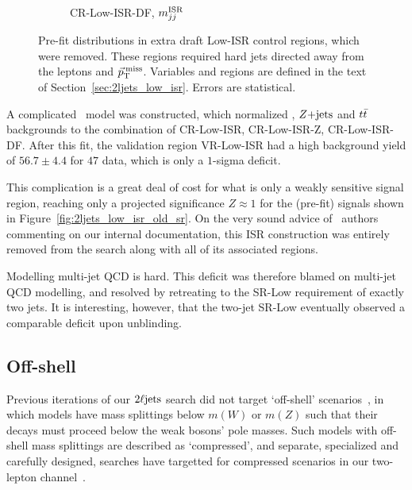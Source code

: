 \begin{figure}[tp]
\begin{subfigure}{0.62\textwidth}
\caption{CR-Low-ISR-DF, $m_{jj}^\mathrm{ISR}$}
\end{subfigure}
\caption[
Pre-fit distributions in extra draft Low-ISR control regions, which were
removed
]{%
Pre-fit distributions in extra draft Low-ISR control regions, which were
removed.
These regions required hard jets directed away from the leptons and $\vec p_\mathrm{T}^\mathrm{\:miss}$.
Variables and regions are defined in the text of
Section~\ref{sec:2ljets_low_isr}.
Errors are statistical.
}
\label{fig:2ljets_low_isr_old_more}
\end{figure}

A complicated \heplikelihood\ model was constructed, which normalized \diboson,
$Z\mathrm{+jets}$ and $t\bar t$ backgrounds to the combination of CR-Low-ISR,
CR-Low-ISR-Z, CR-Low-ISR-DF.
After this fit, the validation region VR-Low-ISR had a high background yield
of $56.7 \pm 4.4$ for $47$ data, which is only a $1$-sigma deficit.

This complication is a great deal of cost for what is only a weakly sensitive
signal region, reaching only a projected significance $Z\approx 1$ for the
(pre-fit) signals shown in Figure~\ref{fig:2ljets_low_isr_old_sr}.
On the very sound advice of \atlas\ authors commenting on our internal
documentation, this ISR construction was entirely removed from the search
along with all of its associated regions.

Modelling multi-jet QCD is hard.
This deficit was therefore blamed on multi-jet QCD modelling, and resolved by
retreating to the SR-Low requirement of exactly two jets.
It is interesting, however, that the two-jet SR-Low eventually observed a
comparable deficit upon unblinding.


\subsection{Off-shell}
\label{sec:2ljets_offshell}
Previous iterations of our $2\ell\mathrm{jets}$ search did not target `off-shell'
scenarios~\cite{atlas_23l_SUSY_2016_24, atlas_2l_SUSY_2013_11}, in which
models have mass splittings below $m(W)$ or $m(Z)$ such that their decays must
proceed below the weak bosons' pole masses.
Such models with off-shell mass splittings are described as
`compressed', and separate, specialized and carefully designed, searches
have targetted for compressed scenarios in our two-lepton channel~\cite{
atlas_susy_compressed_2l_2016_partial_run2,
atlas_susy_compressed_2l_2018_run2
}.

